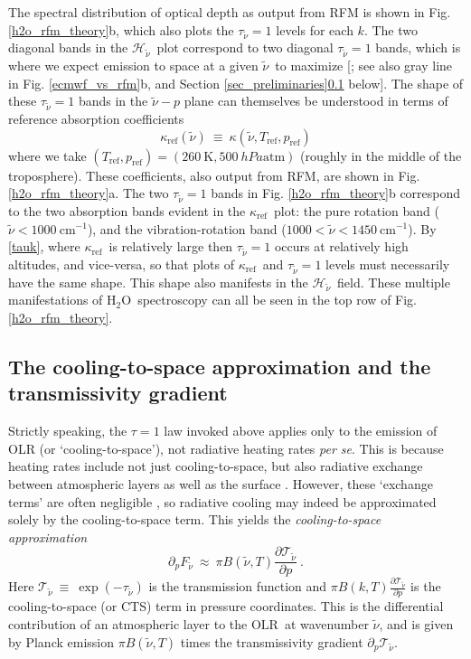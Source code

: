 \documentclass{ametsoc}
\newcommand{\beqn}{\begin{equation}}
\newcommand{\eeqn}{\end{equation}}
\newcommand{\Kelvin}{\ensuremath{\mathrm{K}}}
\newcommand{\cminverse}{\ensuremath{\mathrm{cm^{-1}}}}
\newcommand{\partialder}[2]{\ensuremath{\frac{\partial #1}{\partial #2}}}
\newcommand{\ppp}{\ensuremath{\partial_p}}
\newcommand{\htwo}{\ensuremath{\mathrm{H_2O}}}
\newcommand{\OLR}{\ensuremath{\mathrm{OLR}}}
\newcommand{\wv}{\ensuremath{\widetilde{\nu}}}
\newcommand{\trans}{\ensuremath{\mathcal{T}}}
\newcommand{\ch}{\ensuremath{\mathcal{H}}}
\newcommand{\chk}{\ensuremath{\ch_{\wv}}}
\newcommand{\tauk}{\ensuremath{\tau_{\wv}}}
\newcommand{\kapparef}{\ensuremath{\kappa_{\mathrm{ref}}}}
\newcommand{\Tref}{\ensuremath{T_{\mathrm{ref}}}}
\newcommand{\pref}{\ensuremath{p_{\mathrm{ref}}}}
\begin{document}
 The spectral distribution of optical depth as output from RFM is shown in Fig. \ref{h2o_rfm_theory}b, which also plots the $\tauk=1$ levels for each $k$. The two diagonal bands in the \chk\ plot correspond to two diagonal $\tauk=1$ bands, which is where we expect emission to space at a given \wv\ to maximize [\cite{jeevanjee2019b,wallace2006,petty2006}; see also gray line in Fig. \ref{ecmwf_vs_rfm}b, and Section \ref{sec_preliminaries}\ref{sec_tau=1} below]. The shape of these $\tauk=1$ bands in the $\wv-p$ plane can themselves be understood in terms of reference absorption coefficients 
 \beqn
  \kapparef(\wv)\ \equiv  \ \kappa(\wv,\Tref,\pref)
  \eeqn
  where we take $(\Tref,\pref)=(260\ \Kelvin, 500\ hPa\text{atm})$ (roughly in the middle of the troposphere). These coefficients, also output from RFM, are shown in  Fig. \ref{h2o_rfm_theory}a. The two $\tauk=1$ bands  in Fig. \ref{h2o_rfm_theory}b correspond to the two absorption bands evident in the \kapparef\ plot: the pure rotation band ($\wv < 1000\ \cminverse$), and the vibration-rotation band ($1000 < \wv< 1450 \ \cminverse$). By \eqref{tauk}, where \kapparef\ is relatively large then $\tauk=1$  occurs at relatively high altitudes,  and vice-versa, so that plots of \kapparef\ and $\tauk=1$ levels must necessarily have the same shape. This shape also manifests in the \chk\ field. These multiple manifestations of \htwo\ spectroscopy  can all be seen in the top row of Fig. \ref{h2o_rfm_theory}. 

\subsection{The cooling-to-space approximation and the transmissivity gradient} \label{sec_tau=1}
Strictly speaking, the $\tau=1$ law  invoked above  applies only to the emission of OLR (or `cooling-to-space'), not radiative heating rates \emph{per se}. This is because heating rates include not just cooling-to-space, but also radiative exchange between atmospheric layers as well as the surface \citep{green1967}. However,  these `exchange terms' are often negligible \citep{jeevanjee2019b,clough1992,rodgers1966}, so radiative cooling may indeed be approximated solely by the cooling-to-space term. This yields the  \emph{cooling-to-space approximation} 
\beqn
	\ppp F_{\wv} \ \approx \   \pi B(\wv,T) \partialder{\trans_{\wv}}{p} \  .
	\label{cts}
\eeqn
Here $\trans_{\wv} \ \equiv \ \exp(-\tauk)$ is the transmission function and $\pi B(k,T) \partialder{\trans_{\wv}}{p}$ is the cooling-to-space (or CTS) term in pressure coordinates. This is  the differential contribution of an atmospheric layer to the \OLR\ at wavenumber \wv, and is given by Planck emission $\pi B(\wv,T)$ times the transmissivity gradient $\ppp \trans_{\wv}$.
\end{document}
